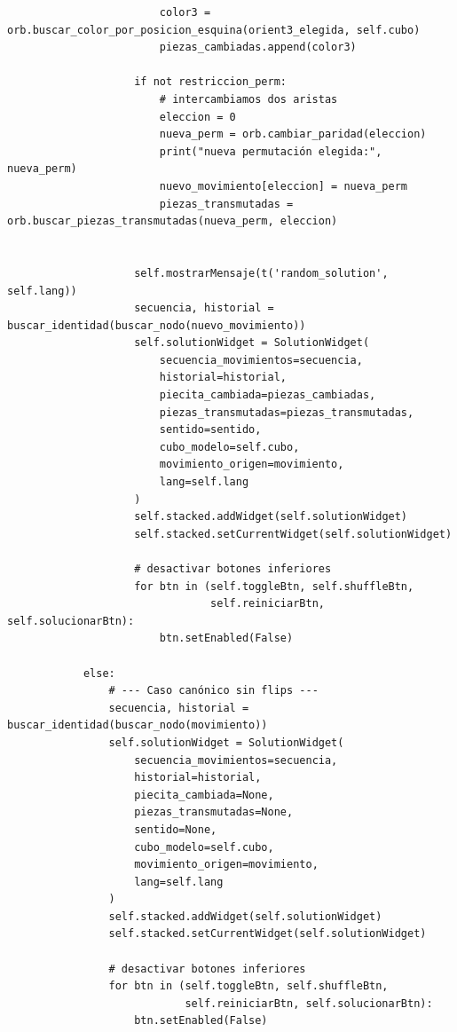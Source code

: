 \begin{lstlisting}
                        color3 = orb.buscar_color_por_posicion_esquina(orient3_elegida, self.cubo)
                        piezas_cambiadas.append(color3)
                              
                    if not restriccion_perm:
                        # intercambiamos dos aristas
                        eleccion = 0
                        nueva_perm = orb.cambiar_paridad(eleccion)
                        print("nueva permutación elegida:", nueva_perm)
                        nuevo_movimiento[eleccion] = nueva_perm
                        piezas_transmutadas = orb.buscar_piezas_transmutadas(nueva_perm, eleccion)
                    
                        
                    self.mostrarMensaje(t('random_solution', self.lang))
                    secuencia, historial = buscar_identidad(buscar_nodo(nuevo_movimiento))
                    self.solutionWidget = SolutionWidget(
                        secuencia_movimientos=secuencia,
                        historial=historial,
                        piecita_cambiada=piezas_cambiadas,
                        piezas_transmutadas=piezas_transmutadas,
                        sentido=sentido,
                        cubo_modelo=self.cubo,
                        movimiento_origen=movimiento,
                        lang=self.lang
                    )
                    self.stacked.addWidget(self.solutionWidget)
                    self.stacked.setCurrentWidget(self.solutionWidget)

                    # desactivar botones inferiores
                    for btn in (self.toggleBtn, self.shuffleBtn,
                                self.reiniciarBtn, self.solucionarBtn):
                        btn.setEnabled(False)
            
            else:
                # --- Caso canónico sin flips ---
                secuencia, historial = buscar_identidad(buscar_nodo(movimiento))
                self.solutionWidget = SolutionWidget(
                    secuencia_movimientos=secuencia,
                    historial=historial,
                    piecita_cambiada=None,
                    piezas_transmutadas=None,
                    sentido=None,
                    cubo_modelo=self.cubo,
                    movimiento_origen=movimiento,
                    lang=self.lang
                )
                self.stacked.addWidget(self.solutionWidget)
                self.stacked.setCurrentWidget(self.solutionWidget)

                # desactivar botones inferiores
                for btn in (self.toggleBtn, self.shuffleBtn,
                            self.reiniciarBtn, self.solucionarBtn):
                    btn.setEnabled(False)
           

\end{lstlisting}
